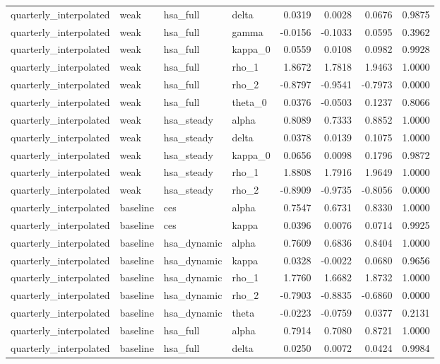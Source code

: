 \begin{tabular}{llllrrrr}
quarterly\_interpolated & weak & hsa\_full & delta & 0.0319 & 0.0028 & 0.0676 & 0.9875 \\
quarterly\_interpolated & weak & hsa\_full & gamma & -0.0156 & -0.1033 & 0.0595 & 0.3962 \\
quarterly\_interpolated & weak & hsa\_full & kappa\_0 & 0.0559 & 0.0108 & 0.0982 & 0.9928 \\
quarterly\_interpolated & weak & hsa\_full & rho\_1 & 1.8672 & 1.7818 & 1.9463 & 1.0000 \\
quarterly\_interpolated & weak & hsa\_full & rho\_2 & -0.8797 & -0.9541 & -0.7973 & 0.0000 \\
quarterly\_interpolated & weak & hsa\_full & theta\_0 & 0.0376 & -0.0503 & 0.1237 & 0.8066 \\
quarterly\_interpolated & weak & hsa\_steady & alpha & 0.8089 & 0.7333 & 0.8852 & 1.0000 \\
quarterly\_interpolated & weak & hsa\_steady & delta & 0.0378 & 0.0139 & 0.1075 & 1.0000 \\
quarterly\_interpolated & weak & hsa\_steady & kappa\_0 & 0.0656 & 0.0098 & 0.1796 & 0.9872 \\
quarterly\_interpolated & weak & hsa\_steady & rho\_1 & 1.8808 & 1.7916 & 1.9649 & 1.0000 \\
quarterly\_interpolated & weak & hsa\_steady & rho\_2 & -0.8909 & -0.9735 & -0.8056 & 0.0000 \\
quarterly\_interpolated & baseline & ces & alpha & 0.7547 & 0.6731 & 0.8330 & 1.0000 \\
quarterly\_interpolated & baseline & ces & kappa & 0.0396 & 0.0076 & 0.0714 & 0.9925 \\
quarterly\_interpolated & baseline & hsa\_dynamic & alpha & 0.7609 & 0.6836 & 0.8404 & 1.0000 \\
quarterly\_interpolated & baseline & hsa\_dynamic & kappa & 0.0328 & -0.0022 & 0.0680 & 0.9656 \\
quarterly\_interpolated & baseline & hsa\_dynamic & rho\_1 & 1.7760 & 1.6682 & 1.8732 & 1.0000 \\
quarterly\_interpolated & baseline & hsa\_dynamic & rho\_2 & -0.7903 & -0.8835 & -0.6860 & 0.0000 \\
quarterly\_interpolated & baseline & hsa\_dynamic & theta & -0.0223 & -0.0759 & 0.0377 & 0.2131 \\
quarterly\_interpolated & baseline & hsa\_full & alpha & 0.7914 & 0.7080 & 0.8721 & 1.0000 \\
quarterly\_interpolated & baseline & hsa\_full & delta & 0.0250 & 0.0072 & 0.0424 & 0.9984 \\

\end{tabular}
